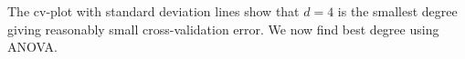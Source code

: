 \documentclass[10pt]{article}
\begin{document}
The cv-plot with standard deviation lines show that $d=4$ is the smallest degree giving reasonably small cross-validation error. We now find best degree using ANOVA.
\end{document}

